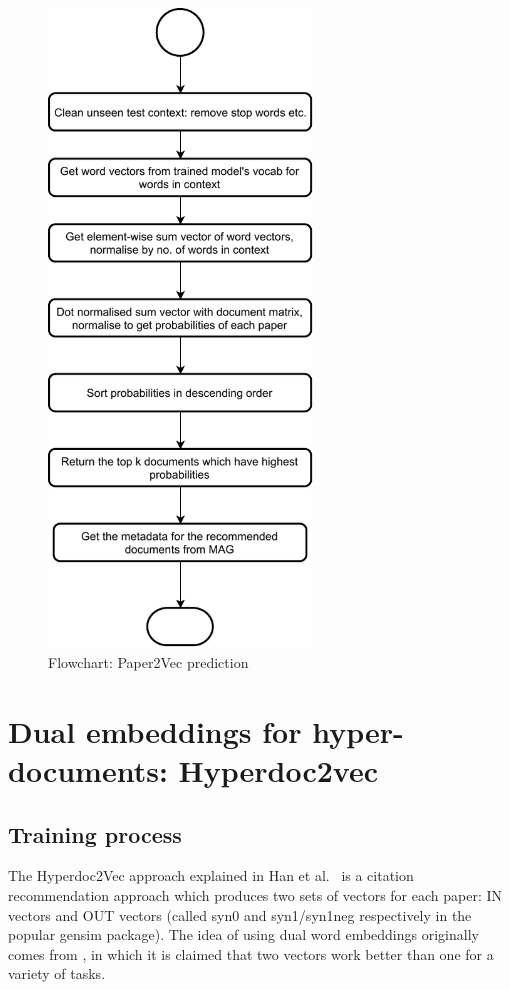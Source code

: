 \begin{figure}
\centering
 \includegraphics[width=7cm]{figures/Approach/Paper2vectest.pdf}
  \caption{Flowchart: Paper2Vec prediction}
  \label{fig:p2vtest}
\end{figure}
\section{Dual embeddings for hyper-documents: Hyperdoc2vec}
\subsection{Training process}
The Hyperdoc2Vec approach explained in Han et al.~\cite{ShiSZZH18} is a citation recommendation approach which produces two sets of vectors for each paper: IN vectors and OUT vectors (called syn0 and syn1/syn1neg respectively in the popular gensim package). The idea of using dual word embeddings originally comes from \cite{NalisnickMCC16}, in which it is claimed that two vectors work better than one for a variety of tasks. 

